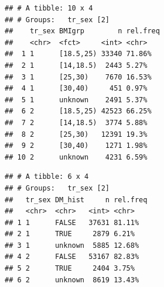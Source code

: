 \documentclass[]{article}
\newenvironment{Shaded}{\begin{snugshade}}{\end{snugshade}}
\newcommand{\DataTypeTok}[1]{\textcolor[rgb]{0.13,0.29,0.53}{#1}}
\newcommand{\DecValTok}[1]{\textcolor[rgb]{0.00,0.00,0.81}{#1}}
\newcommand{\KeywordTok}[1]{\textcolor[rgb]{0.13,0.29,0.53}{\textbf{#1}}}
\newcommand{\NormalTok}[1]{#1}
\newcommand{\OperatorTok}[1]{\textcolor[rgb]{0.81,0.36,0.00}{\textbf{#1}}}
\newcommand{\OtherTok}[1]{\textcolor[rgb]{0.56,0.35,0.01}{#1}}
\newcommand{\StringTok}[1]{\textcolor[rgb]{0.31,0.60,0.02}{#1}}
\begin{document}
\begin{verbatim}
## # A tibble: 10 x 4
## # Groups:   tr_sex [2]
##    tr_sex BMIgrp        n rel.freq
##    <chr>  <fct>     <int> <chr>   
##  1 1      [18.5,25) 33340 71.86%  
##  2 1      [14,18.5)  2443 5.27%   
##  3 1      [25,30)    7670 16.53%  
##  4 1      [30,40)     451 0.97%   
##  5 1      unknown    2491 5.37%   
##  6 2      [18.5,25) 42523 66.25%  
##  7 2      [14,18.5)  3774 5.88%   
##  8 2      [25,30)   12391 19.3%   
##  9 2      [30,40)    1271 1.98%   
## 10 2      unknown    4231 6.59%
\end{verbatim}

\begin{Shaded}
\end{Shaded}

\begin{verbatim}
## # A tibble: 6 x 4
## # Groups:   tr_sex [2]
##   tr_sex DM_hist     n rel.freq
##   <chr>  <chr>   <int> <chr>   
## 1 1      FALSE   37631 81.11%  
## 2 1      TRUE     2879 6.21%   
## 3 1      unknown  5885 12.68%  
## 4 2      FALSE   53167 82.83%  
## 5 2      TRUE     2404 3.75%   
## 6 2      unknown  8619 13.43%
\end{verbatim}

\begin{Shaded}
\end{Shaded}
\end{document}
